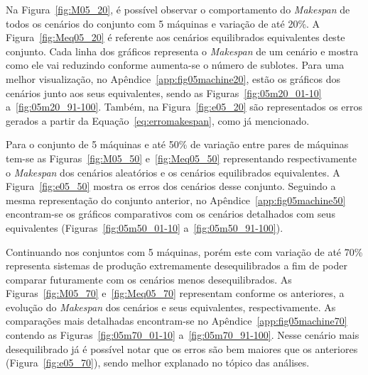     Na Figura~\ref{fig:M05_20}, é possível observar o comportamento do \textit{Makespan} de todos os cenários do conjunto com 5 máquinas e variação de até 20\%. A Figura~\ref{fig:Meq05_20} é referente aos cenários equilibrados equivalentes deste conjunto. Cada linha dos gráficos representa o \textit{Makespan} de um cenário e mostra como ele vai reduzindo conforme aumenta-se o número de sublotes. Para uma melhor visualização, no Apêndice~\ref{app:fig05machine20}, estão os gráficos dos cenários junto aos seus equivalentes, sendo as Figuras~\ref{fig:05m20_01-10} a~\ref{fig:05m20_91-100}. Também, na Figura~\ref{fig:e05_20} são representados os erros gerados a partir da Equação~\ref{eq:erromakespan}, como já mencionado. 
    
    
    
    
    
    
    
    Para o conjunto de 5 máquinas e até 50\% de variação entre pares de máquinas tem-se as Figuras~\ref{fig:M05_50} e~\ref{fig:Meq05_50} representando respectivamente o \textit{Makespan} dos cenários aleatórios e os cenários equilibrados equivalentes. A Figura~\ref{fig:e05_50} mostra os erros dos cenários desse conjunto. Seguindo a mesma representação do conjunto anterior, no Apêndice~\ref{app:fig05machine50} encontram-se os gráficos comparativos com os cenários detalhados com seus equivalentes (Figuras~\ref{fig:05m50_01-10} a~\ref{fig:05m50_91-100}).
    
    
    
    
    
    
    
    Continuando nos conjuntos com 5 máquinas, porém este com variação de até 70\% representa sistemas de produção extremamente desequilibrados a fim de poder comparar futuramente com os cenários menos desequilibrados. As Figuras~\ref{fig:M05_70} e~\ref{fig:Meq05_70} representam conforme os anteriores, a evolução do \textit{Makespan} dos cenários e seus equivalentes, respectivamente. As comparações mais detalhadas encontram-se no Apêndice~\ref{app:fig05machine70} contendo as Figuras~\ref{fig:05m70_01-10} a~\ref{fig:05m70_91-100}. Nesse cenário mais desequilibrado já é possível notar que os erros são bem maiores que os anteriores (Figura~\ref{fig:e05_70}), sendo melhor explanado no tópico das análises.
    
